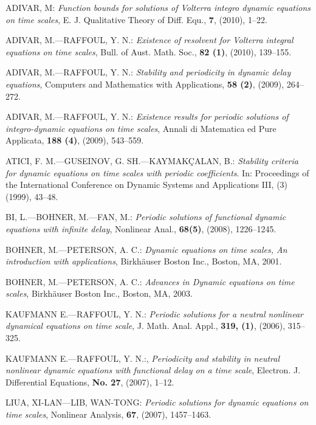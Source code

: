 \documentclass[b5paper,reqno]{amsart}\usepackage{amsfonts}
\theoremstyle{plain}
\numberwithin{equation}{section}
\begin{document}
\begin{thebibliography}{xxx}                                                                                               

ADIVAR, M:
\textit{Function bounds for solutions of Volterra integro dynamic equations on time scales}, 
E. J. Qualitative Theory of Diff. Equ., \textbf{7}, (2010), 1--22.

ADIVAR, M.---RAFFOUL, Y. N.: 
\textit{Existence of resolvent for Volterra integral equations on time scales}, 
Bull. of Aust. Math. Soc., \textbf{82 (1)}, (2010), 139--155.

ADIVAR, M.---RAFFOUL, Y. N.: 
\textit{Stability and periodicity in dynamic delay equations}, 
Computers and Mathematics with Applications, \textbf{58 (2)}, (2009), 264--272.

ADIVAR, M.---RAFFOUL, Y. N.:
\textit{Existence results for periodic solutions of integro-dynamic equations on time scales}, 
Annali di Matematica ed Pure Applicata, \textbf{188 (4)}, (2009), 543--559.

ATICI, F. M.---GUSEINOV, G. SH.---KAYMAK\c{C}ALAN, B.:
\textit{Stability criteria for dynamic equations on time scales with periodic coefficients}.
In: Proceedings of the International Conference on Dynamic Systems and Applications III, (3) (1999), 43--48.

BI, L.---BOHNER, M.---FAN, M.:
\textit{Periodic solutions of functional dynamic equations with infinite delay}, 
Nonlinear Anal., \textbf{68(5)}, (2008), 1226--1245.

BOHNER, M.---PETERSON, A. C.:
\textit{Dynamic equations on time scales, An introduction with applications},
Birkh\"{a}user Boston Inc., Boston, MA, 2001.

BOHNER, M.---PETERSON, A. C.: 
\textit{Advances in Dynamic equations on time scales}, 
Birkh\"{a}user Boston Inc., Boston, MA, 2003.

KAUFMANN E.---RAFFOUL, Y. N.: 
\textit{Periodic solutions for a neutral nonlinear dynamical equations on time scale}, 
J. Math. Anal. Appl., \textbf{319, (1)}, (2006), 315--325.

KAUFMANN E.---RAFFOUL, Y. N.:, 
\textit{Periodicity and stability in neutral nonlinear dynamic equations with functional delay on a
time scale}, 
Electron. J. Differential Equations, \textbf{No. 27}, (2007), 1--12.

LIUA, XI-LAN---LIB, WAN-TONG: 
\textit{Periodic solutions for dynamic equations on time scales}, 
Nonlinear Analysis, \textbf{67}, (2007), 1457--1463.
\end{thebibliography}
\end{document}
